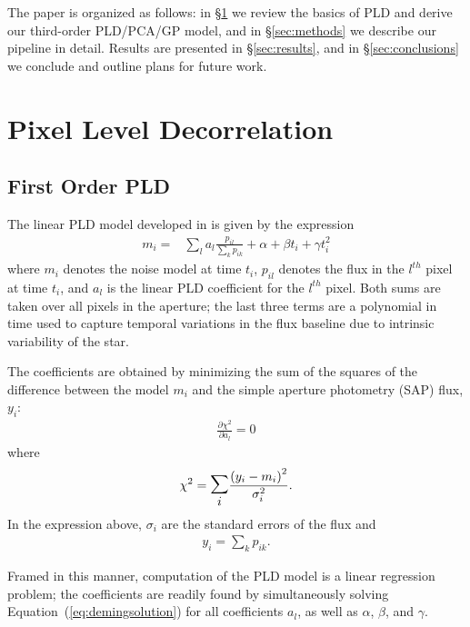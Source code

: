 \documentclass[]{emulateapj}
\begin{document}
The paper is organized as follows: in \S\ref{sec:pld} we review the basics of PLD and
derive our third-order PLD/PCA/GP model, and in \S\ref{sec:methods} we describe our pipeline
in detail. Results are presented in \S\ref{sec:results}, and in \S\ref{sec:conclusions}
we conclude and outline plans for future work.

\section{Pixel Level Decorrelation}
\label{sec:pld}
\subsection{First Order PLD}
\label{sec:firstorder}
The linear PLD model developed in \cite{DEM15} is given by the expression
\begin{align}
\label{eq:demingmodel}
m_i = &\sum\limits_{l}a_l\frac{p_{il}}{\sum\limits_{k}p_{ik}} + \alpha + \beta t_i + \gamma t_i^2
\end{align}
where $m_i$ denotes the noise model at time $t_i$,
$p_{il}$ denotes the flux in the $l^{th}$ pixel at time $t_i$, and $a_l$ is
the linear PLD coefficient for the $l^{th}$ pixel. Both sums are taken over
all pixels in the aperture; the last three terms are a polynomial in time used
to capture temporal variations in the flux baseline due to intrinsic variability
of the star.

The coefficients are obtained by minimizing the sum of the squares of the difference
between the model $m_i$ and the simple aperture photometry (SAP) flux, $y_i$:
\begin{align}
\label{eq:demingsolution}
\frac{\partial \chi^2}{\partial a_l} = 0
\end{align}
where
\begin{align}
\label{eq:demingchisq}
\chi^2 = \mathlarger{\mathlarger{\sum\limits_{i}}}\frac{\left(y_i - m_i\right)^2}{\sigma_i^2}.
\end{align}
In the expression above, $\sigma_i$ are the standard errors of the flux and
\begin{align}
\label{eq:demingsap}
y_i = \sum\limits_{k}p_{ik}.
\end{align}

Framed in this manner, computation of the PLD model is a linear regression problem; the
coefficients are readily found by simultaneously solving Equation~(\ref{eq:demingsolution})
for all coefficients $a_l$, as well as $\alpha$, $\beta$, and $\gamma$.
%
\end{document}
